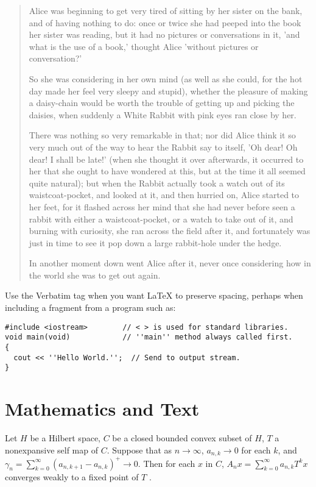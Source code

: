 \documentclass[11pt,spanish]{report}
\begin{document}
\begin{quotation}
Alice was beginning to get very tired of sitting by her sister on the bank,
and of having nothing to do: once or twice she had peeped into the book her
sister was reading, but it had no pictures or conversations in it, 'and what
is the use of a book,' thought Alice 'without pictures or conversation?'

So she was considering in her own mind (as well as she could, for the hot day
made her feel very sleepy and stupid), whether the pleasure of making a
daisy-chain would be worth the trouble of getting up and picking the daisies,
when suddenly a White Rabbit with pink eyes ran close by her.

There was nothing so very remarkable in that; nor did Alice think it so very
much out of the way to hear the Rabbit say to itself, 'Oh dear! Oh dear! I
shall be late!' (when she thought it over afterwards, it occurred to her that
she ought to have wondered at this, but at the time it all seemed quite
natural); but when the Rabbit actually took a watch out of its
waistcoat-pocket, and looked at it, and then hurried on, Alice started to her
feet, for it flashed across her mind that she had never before seen a rabbit
with either a waistcoat-pocket, or a watch to take out of it, and burning with
curiosity, she ran across the field after it, and fortunately was just in time
to see it pop down a large rabbit-hole under the hedge.

In another moment down went Alice after it, never once considering how in the
world she was to get out again.
\end{quotation}

Use the Verbatim tag when you want \LaTeX {} to preserve spacing, perhaps when
including a fragment from a program such as:
\begin{verbatim}
#include <iostream>        // < > is used for standard libraries.
void main(void)            // ''main'' method always called first.
{
  cout << ''Hello World.'';  // Send to output stream.
}
\end{verbatim}

\section{Mathematics and Text}

Let $H$ be a Hilbert space, $C$ be a closed bounded convex subset of $H$, $T$
a nonexpansive self map of $C$. Suppose that as $n\rightarrow\infty$,
$a_{n,k}\rightarrow0$ for each $k$, and $\gamma_{n}=\sum_{k=0}^{\infty}\left(
a_{n,k+1}-a_{n,k}\right)  ^{+}\rightarrow0.$ Then for each $x$ in $C$,
$A_{n}x=\sum_{k=0}^{\infty}a_{n,k}T^{k}x$ converges weakly to a fixed point of
$T$ .
\end{document}
